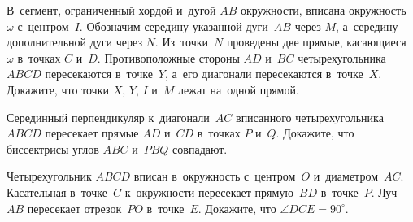 \begin{problems}
\item
В~сегмент, ограниченный хордой и~дугой $AB$ окружности, вписана окружность
$\omega$ с~центром~$I$.
Обозначим середину указанной дуги~$AB$ через $M$, а~середину дополнительной
дуги через $N$.
Из~точки~$N$ проведены две прямые, касающиеся $\omega$ в~точках $C$ и~$D$.
Противоположные стороны $AD$ и~$BC$ четырехугольника $ABCD$ пересекаются
в~точке~$Y$, а~его диагонали пересекаются в~точке~$X$.
Докажите, что точки $X$, $Y$, $I$ и~$M$ лежат на~одной прямой.

\item
Серединный перпендикуляр к~диагонали~$AC$ вписанного четырехугольника
$ABCD$ пересекает прямые $AD$ и~$CD$ в~точках $P$ и~$Q$.
Докажите, что биссектрисы углов $ABC$ и~$PBQ$ совпадают.

\item
Четырехугольник $ABCD$ вписан в~окружность с~центром~$O$ и~диаметром~$AC$.
Касательная в~точке~$C$ к~окружности пересекает прямую~$BD$ в~точке~$P$.
Луч~$AB$ пересекает отрезок~$PO$ в~точке~$E$.
Докажите, что $\angle DCE = 90^{\circ}$.

\end{problems}


